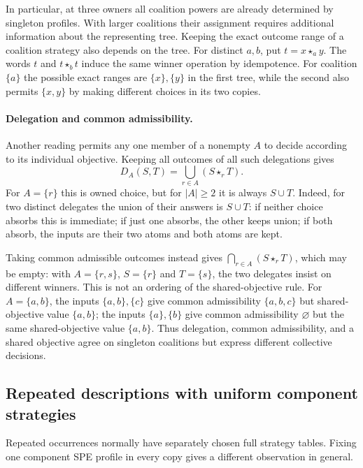 In particular, at three owners all coalition powers are already
determined by singleton profiles. With larger coalitions their
assignment requires additional information about the representing tree.
Keeping the exact outcome range of a coalition strategy also depends
on the tree. For distinct $a,b$, put $t=x\star_a y$. The words $t$
and $t\star_b t$ induce the same winner operation by idempotence.
For coalition $\{a\}$ the possible exact ranges are $\{x\},\{y\}$
in the first tree, while the second also permits $\{x,y\}$ by making
different choices in its two copies.

\paragraph{Delegation and common admissibility.}
Another reading permits any one member of a nonempty $A$ to decide
according to its individual objective. Keeping all outcomes of all
such delegations gives
\[
 D_A(S,T)=\bigcup_{r\in A}(S\star_r T).
\]
For $A=\{r\}$ this is owned choice, but for $|A|\geq2$ it is always
$S\cup T$. Indeed, for two distinct delegates the union of their
answers is $S\cup T$: if neither choice absorbs this is immediate;
if just one absorbs, the other keeps union; if both absorb, the
inputs are their two atoms and both atoms are kept.

Taking common admissible outcomes instead gives
$\bigcap_{r\in A}(S\star_r T)$, which may be empty: with
$A=\{r,s\}$, $S=\{r\}$ and $T=\{s\}$, the two delegates insist
on different winners. This is not an ordering of the shared-objective
rule. For $A=\{a,b\}$, the inputs $\{a,b\},\{c\}$ give
common admissibility $\{a,b,c\}$ but shared-objective value
$\{a,b\}$; the inputs $\{a\},\{b\}$ give common admissibility
$\varnothing$ but the same shared-objective value $\{a,b\}$.
Thus delegation, common admissibility, and a shared objective agree
on singleton coalitions but express different collective decisions.

\subsection{Repeated descriptions with uniform component strategies}

Repeated occurrences normally have separately chosen full strategy
tables. Fixing one component SPE profile in every copy gives a different
observation in general.

